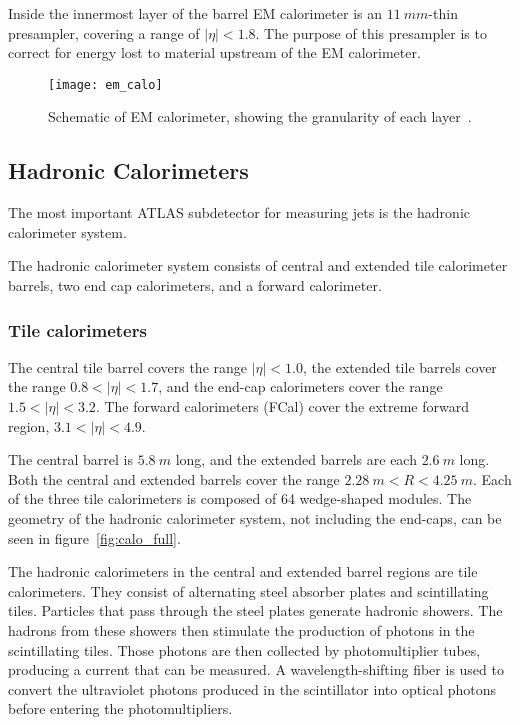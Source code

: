 Inside the innermost layer of the barrel EM calorimeter is an $11~mm$-thin presampler, covering a range of $|\eta| < 1.8$.
The purpose of this presampler is to correct for energy lost to material upstream of the EM calorimeter.

\begin{figure}[!ht]\centering
\texttt{[image: em\_calo]}
\caption{Schematic of EM calorimeter, showing the granularity of each layer~\cite{em-calo}.}
\label{fig:em_calo}
\end{figure}

\subsection{Hadronic Calorimeters}\label{subsec:had_cal}

The most important ATLAS subdetector for measuring jets is the hadronic calorimeter system.

The hadronic calorimeter system consists of central and extended tile calorimeter barrels, two end cap calorimeters,
and a forward calorimeter.

\subsubsection{Tile calorimeters}

The central tile barrel covers the range $|\eta|<1.0$, the extended tile barrels cover the range $0.8 < |\eta| < 1.7$,
and the end-cap calorimeters cover the range $1.5 < |\eta| < 3.2$.
The forward calorimeters (FCal) cover the extreme forward region, $3.1 < |\eta| < 4.9$.

The central barrel is $5.8~m$ long, and the extended barrels are each $2.6~m$ long.
Both the central and extended barrels cover the range $2.28~m < R < 4.25~m$.
Each of the three tile calorimeters is composed of 64 wedge-shaped modules.
The geometry of the hadronic calorimeter system, not including the end-caps, can be seen in figure~\ref{fig:calo_full}.

The hadronic calorimeters in the central and extended barrel regions are tile calorimeters.
They consist of alternating steel absorber plates and scintillating tiles.
Particles that pass through the steel plates generate hadronic showers.
The hadrons from these showers then stimulate the production of photons in the scintillating tiles.
Those photons are then collected by photomultiplier tubes, producing a current that can be measured.
A wavelength-shifting fiber is used to convert the ultraviolet photons produced in the scintillator into optical photons
before entering the photomultipliers.

